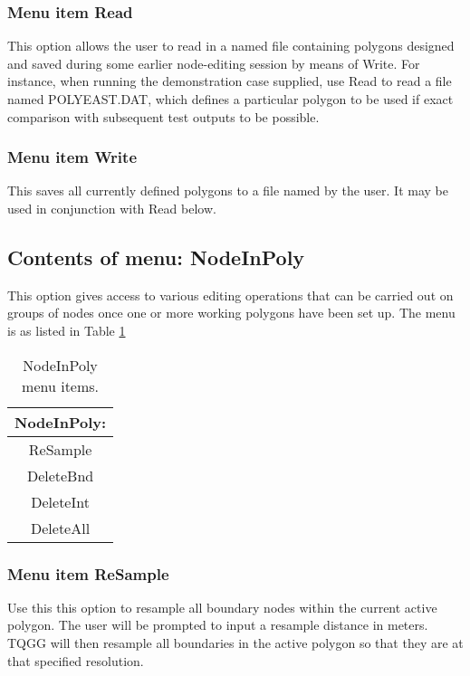 \documentclass{article}
\begin{document}
\subsubsection[Menu item Read]{Menu item Read}
This option allows the user to read in a named file containing polygons designed and saved during some earlier node-editing session by means of Write. For instance, when running the demonstration case supplied, use Read to read a file named POLYEAST.DAT, which defines a particular polygon to be used if exact comparison with subsequent test outputs to be possible.

\subsubsection[Menu item Write]{Menu item Write}
This saves all currently defined polygons to a file named by the user. It may be used in conjunction with Read below.

\subsection{Contents of menu: NodeInPoly}
This option gives access to various editing operations that can be carried out on groups of nodes once one or more working polygons have been set up. The menu is as listed in Table \ref{tab:NODEINPOLY} 

\begin{table}[htb!]
 \caption{NodeInPoly menu items.}
  \begin{center}
   \begin{tabular}{|c|}
    \hline
NodeInPoly:\\     \hline
ReSample \\ DeleteBnd \\ DeleteInt \\ DeleteAll \\
    \hline
   \end{tabular}
   \label{tab:NODEINPOLY}
  \end{center}
\end{table}

\subsubsection[Menu item ReSample]{Menu item ReSample}
Use this this option to resample all boundary nodes within the current active polygon. The user will be prompted to input a resample distance in meters. TQGG will then resample all boundaries in the active polygon so that they are at that specified resolution.
\end{document}
